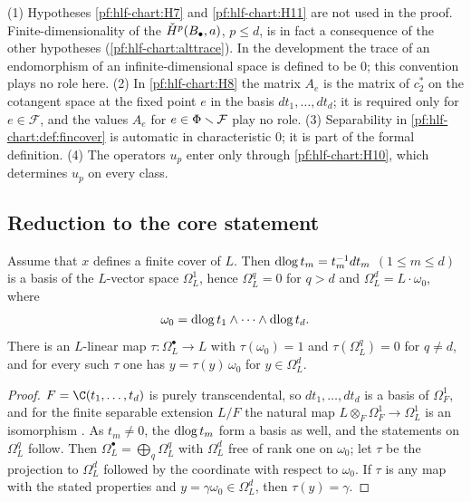 \begin{remark}\label{pf:hlf-chart:rem:stmt}
(1) Hypotheses \ref{pf:hlf-chart:H7} and \ref{pf:hlf-chart:H11} are not used in the proof. Finite-dimensionality of the
$\check{H}^p(B_\bullet,a)$, $p\le d$, is in fact a consequence of the other hypotheses (\cref{pf:hlf-chart:alttrace}). In the development the trace of
an endomorphism of an infinite-dimensional space is defined to be $0$; this convention plays no role here.
(2) In \ref{pf:hlf-chart:H8} the matrix $A_e$ is the matrix of $c_2^*$ on the cotangent space at the fixed point $e$ in the basis
$dt_1,\dots,dt_d$; it is required only for $e\in\mathcal F$, and the values $A_e$ for $e\in\Phi\smallsetminus\mathcal F$ play no role.
(3) Separability in \cref{pf:hlf-chart:def:fincover} is automatic in characteristic $0$; it is part of the formal definition.
(4) The operators $u_p$ enter only through \ref{pf:hlf-chart:H10}, which determines $u_p$ on every class.
\end{remark}

\subsection{Reduction to the core statement}\label{pf:hlf-chart:ss:red}

\begin{lemma}\label{pf:hlf-chart:dlog}
Assume that $x$ defines a finite cover of $L$. Then $\operatorname{dlog} t_m=t_m^{-1}dt_m$ $(1\le m\le d)$ is a basis of the $L$-vector space
$\Omega^1_L$, hence $\Omega^q_L=0$ for $q>d$ and $\Omega^d_L=L\cdot\omega_0$, where
\[
  \omega_0=\operatorname{dlog} t_1\wedge\dots\wedge\operatorname{dlog} t_d .
\]
There is an $L$-linear map $\tau\colon\Omega^\bullet_L\to L$ with $\tau(\omega_0)=1$ and $\tau(\Omega^q_L)=0$ for $q\ne d$, and for every such $\tau$
one has $y=\tau(y)\,\omega_0$ for $y\in\Omega^d_L$.
\end{lemma}

\begin{proof}
$F=\C(t_1,\dots,t_d)$ is purely transcendental, so $dt_1,\dots,dt_d$ is a basis of $\Omega^1_F$, and for the finite separable extension
$L/F$ the natural map $L\otimes_F\Omega^1_F\to\Omega^1_L$ is an isomorphism \cite[\S\S25--26]{Matsumura1989}. As $t_m\ne0$,
the $\operatorname{dlog} t_m$ form a basis as well, and the statements on $\Omega^q_L$ follow. Then $\Omega^\bullet_L=\bigoplus_q\Omega^q_L$ with
$\Omega^d_L$ free of rank one on $\omega_0$; let $\tau$ be the projection to $\Omega^d_L$ followed by the coordinate with respect to
$\omega_0$. If $\tau$ is any map with the stated properties and $y=\gamma\omega_0\in\Omega^d_L$, then $\tau(y)=\gamma$.
\end{proof}

